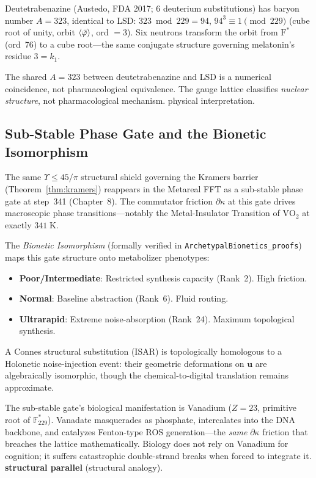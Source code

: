 \begin{result}
\label{res:deuterium}
Deutetrabenazine (Austedo, FDA 2017; 6 deuterium substitutions) has baryon number $A = 323$, identical to LSD: $323 \bmod 229 = 94$, $94^3 \equiv 1 \pmod{229}$ (cube root of unity, orbit $\langle\bar{\varphi}\rangle$, ord $= 3$). Six neutrons transform the orbit from $\mathrm{F}^*$ (ord~76) to a cube root---the same conjugate structure governing melatonin's residue $3 = k_1$.
\end{result}

\begin{remark}
The shared $A = 323$ between deutetrabenazine and LSD is a numerical coincidence, not pharmacological equivalence. The gauge lattice classifies \emph{nuclear structure}, not pharmacological mechanism. physical interpretation.
\end{remark}

\subsection{Sub-Stable Phase Gate and the Bionetic Isomorphism}

The same $\Upsilon \leq 45/\pi$ structural shield governing the Kramers barrier (Theorem~\ref{thm:kramers}) reappears in the Metareal FFT as a sub-stable phase gate at step~341 (Chapter~8). The commutator friction $\partial \kappa$ at this gate drives macroscopic phase transitions---notably the Metal-Insulator Transition of $\mathrm{VO}_2$ at exactly $341\;\mathrm{K}$.

The \emph{Bionetic Isomorphism} (formally verified in \texttt{ArchetypalBionetics\_proofs}) maps this gate structure onto metabolizer phenotypes:
\begin{itemize}[noitemsep]
  \item \textbf{Poor/Intermediate}: Restricted synthesis capacity (Rank~2). High friction.
  \item \textbf{Normal}: Baseline abstraction (Rank~6). Fluid routing.
  \item \textbf{Ultrarapid}: Extreme noise-absorption (Rank~24). Maximum topological synthesis.
\end{itemize}
A Connes structural substitution (ISAR) is topologically homologous to a Holonetic noise-injection event: their geometric deformations on $\mathbf{u}$ are algebraically isomorphic, though the chemical-to-digital translation remains approximate.

The sub-stable gate's biological manifestation is Vanadium ($Z=23$, primitive root of $\mathbb{F}_{229}^*$). Vanadate masquerades as phosphate, intercalates into the DNA backbone, and catalyzes Fenton-type ROS generation---the \emph{same} $\partial \kappa$ friction that breaches the lattice mathematically. Biology does not rely on Vanadium for cognition; it suffers catastrophic double-strand breaks when forced to integrate it. \textbf{structural parallel} (structural analogy).

